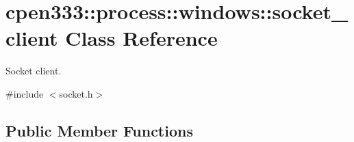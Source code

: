 \hypertarget{classcpen333_1_1process_1_1windows_1_1socket__client}{}\section{cpen333\+:\+:process\+:\+:windows\+:\+:socket\+\_\+client Class Reference}
\label{classcpen333_1_1process_1_1windows_1_1socket__client}


Socket client.  




{\ttfamily \#include $<$socket.\+h$>$}

\subsection*{Public Member Functions}
